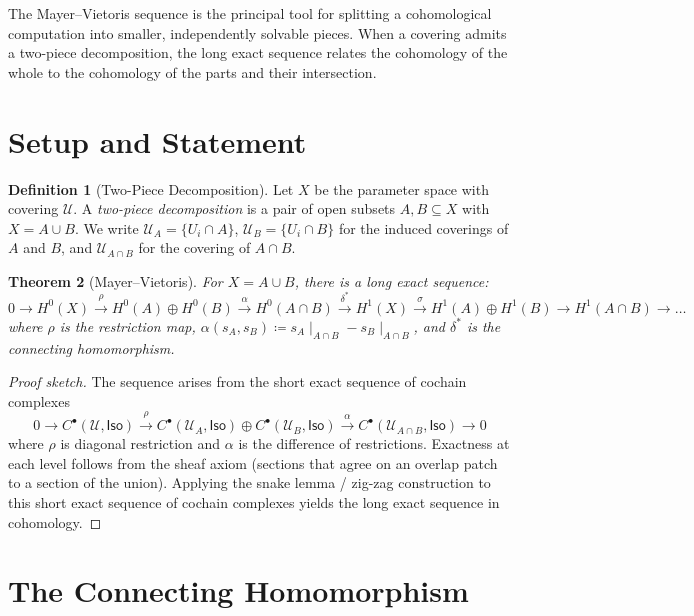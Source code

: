 \documentclass[11pt,a4paper]{report}
\theoremstyle{definition}
\newtheorem{definition}{Definition}[chapter]
\theoremstyle{plain}
\newtheorem{theorem}[definition]{Theorem}
\newcommand{\covers}{\mathcal{U}}
\newcommand{\Iso}{\mathsf{Iso}}
\newcommand{\Hzero}{H^0}
\newcommand{\Hone}{H^1}
\newcommand{\restr}[2]{#1\!\!\mid_{#2}}
\begin{document}
The Mayer--Vietoris sequence is the principal tool for splitting a
cohomological computation into smaller, independently solvable pieces.
When a covering admits a two-piece decomposition, the long exact
sequence relates the cohomology of the whole to the cohomology of the
parts and their intersection.

\section{Setup and Statement}

\begin{definition}[Two-Piece Decomposition]
\label{def:two-piece}
Let $X$ be the parameter space with covering $\covers$.  A
\emph{two-piece decomposition} is a pair of open subsets $A, B
\subseteq X$ with $X = A \cup B$.  We write $\covers_A = \{U_i
\cap A\}$, $\covers_B = \{U_i \cap B\}$ for the induced coverings
of $A$ and $B$, and $\covers_{A \cap B}$ for the covering of
$A \cap B$.
\end{definition}

\begin{theorem}[Mayer--Vietoris]
\label{thm:mv}
For $X = A \cup B$, there is a long exact sequence:
\[
  0 \to \Hzero(X) \xrightarrow{\rho} \Hzero(A) \oplus \Hzero(B)
  \xrightarrow{\alpha} \Hzero(A \cap B)
  \xrightarrow{\delta^*} \Hone(X) \xrightarrow{\sigma} \Hone(A) \oplus \Hone(B)
  \to \Hone(A \cap B) \to \ldots
\]
where $\rho$ is the restriction map, $\alpha(s_A, s_B) \coloneqq
\restr{s_A}{A \cap B} - \restr{s_B}{A \cap B}$, and $\delta^*$
is the connecting homomorphism.
\end{theorem}

\begin{proof}[Proof sketch]
The sequence arises from the short exact sequence of cochain
complexes
\[
  0 \to C^\bullet(\covers, \Iso) \xrightarrow{\rho}
  C^\bullet(\covers_A, \Iso) \oplus C^\bullet(\covers_B, \Iso)
  \xrightarrow{\alpha}
  C^\bullet(\covers_{A\cap B}, \Iso) \to 0
\]
where $\rho$ is diagonal restriction and $\alpha$ is the difference
of restrictions.  Exactness at each level follows from the sheaf
axiom (sections that agree on an overlap patch to a section of
the union).  Applying the snake lemma / zig-zag construction to
this short exact sequence of cochain complexes yields the long
exact sequence in cohomology.
\end{proof}

\section{The Connecting Homomorphism}
\end{document}
